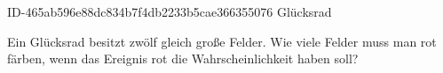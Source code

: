 \begin{exercise}
      {ID-465ab596e88dc834b7f4db2233b5cae366355076}
      {Glücksrad}
  \ifproblem\problem\par
    Ein Glücksrad besitzt zwölf gleich große Felder. Wie viele Felder muss man
    rot färben, wenn das Ereignis \glqq rot\grqq{} die Wahrscheinlichkeit 
    haben soll?
  \fi
\end{exercise}
